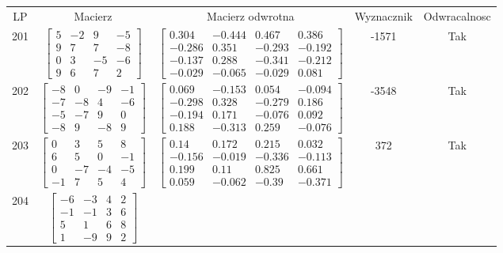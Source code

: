 \documentclass[a4paper,12pt]{article}
\begin{document}
\bgroup {} \vspace{0.2in} \begin{tabular}{c c c c c}
LP & Macierz & Macierz odwrotna & Wyznacznik & Odwracalnosc\\
201
&
$\begin{bmatrix} 5 & -2 & 9 & -5 \\ 9 & 7 & 7 & -8 \\ 0 & 3 & -5 & -6 \\ 9 & 6 & 7 & 2 \end{bmatrix}$
&
$\begin{bmatrix} 0.304 & -0.444 & 0.467 & 0.386 \\ -0.286 & 0.351 & -0.293 & -0.192 \\ -0.137 & 0.288 & -0.341 & -0.212 \\ -0.029 & -0.065 & -0.029 & 0.081 \end{bmatrix}$
&
-1571
&
Tak
\\
202
&
$\begin{bmatrix} -8 & 0 & -9 & -1 \\ -7 & -8 & 4 & -6 \\ -5 & -7 & 9 & 0 \\ -8 & 9 & -8 & 9 \end{bmatrix}$
&
$\begin{bmatrix} 0.069 & -0.153 & 0.054 & -0.094 \\ -0.298 & 0.328 & -0.279 & 0.186 \\ -0.194 & 0.171 & -0.076 & 0.092 \\ 0.188 & -0.313 & 0.259 & -0.076 \end{bmatrix}$
&
-3548
&
Tak
\\
203
&
$\begin{bmatrix} 0 & 3 & 5 & 8 \\ 6 & 5 & 0 & -1 \\ 0 & -7 & -4 & -5 \\ -1 & 7 & 5 & 4 \end{bmatrix}$
&
$\begin{bmatrix} 0.14 & 0.172 & 0.215 & 0.032 \\ -0.156 & -0.019 & -0.336 & -0.113 \\ 0.199 & 0.11 & 0.825 & 0.661 \\ 0.059 & -0.062 & -0.39 & -0.371 \end{bmatrix}$
&
372
&
Tak
\\
204
&
$\begin{bmatrix} -6 & -3 & 4 & 2 \\ -1 & -1 & 3 & 6 \\ 5 & 1 & 6 & 8 \\ 1 & -9 & 9 & 2 \end{bmatrix}$

\end{tabular}
\end{document}
